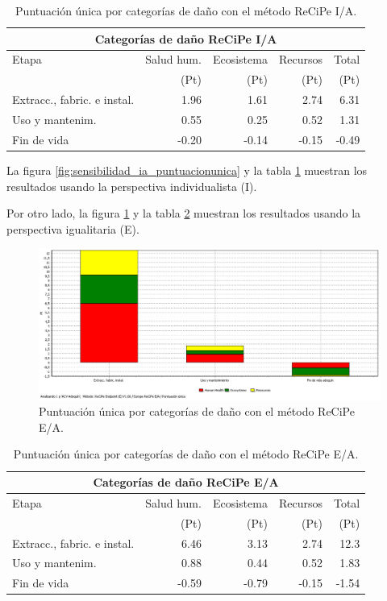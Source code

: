 \begin{table}[!htb]
\centering
\begin{tabular}{p{6cm}rrrr}
\toprule
\multicolumn{5}{c}{Categorías de daño ReCiPe I/A}\\
\midrule
Etapa & Salud hum. & Ecosistema & Recursos & Total\\
 & (Pt) & (Pt) & (Pt) & (Pt)\\
\midrule
Extracc., fabric. e instal. & 1.96 & 1.61 & 2.74 & 6.31\\
Uso y mantenim. & 0.55 & 0.25 & 0.52 & 1.31\\
Fin de vida & -0.20 & -0.14 & -0.15 & -0.49\\
\bottomrule
\end{tabular}
\caption{Puntuación única por categorías de daño con el método ReCiPe I/A.}
\label{sensibilidad_ia_puntuacionunica}
\end{table}

La figura \ref{fig:sensibilidad_ia_puntuacionunica} y la tabla \ref{sensibilidad_ia_puntuacionunica} muestran los resultados usando la perspectiva individualista (I).

Por otro lado, la figura \ref{fig:sensibilidad_ea_puntuacionunica} y la tabla \ref{sensibilidad_ea_puntuacionunica} muestran los resultados usando la perspectiva igualitaria (E).

\begin{figure}[!htb]
\centering
\includegraphics[width=15cm]{img/sensibilidad_ea_puntuacionunica.png}
\caption{Puntuación única por categorías de daño con el método ReCiPe E/A.}
\label{fig:sensibilidad_ea_puntuacionunica}
\end{figure}

\begin{table}[!htb]
\centering
\begin{tabular}{p{6cm}rrrr}
\toprule
\multicolumn{5}{c}{Categorías de daño ReCiPe E/A}\\
\midrule
Etapa & Salud hum. & Ecosistema & Recursos & Total\\
 & (Pt) & (Pt) & (Pt) & (Pt)\\
\midrule
Extracc., fabric. e instal. & 6.46 & 3.13 & 2.74 & 12.3\\
Uso y mantenim. & 0.88 & 0.44 & 0.52 & 1.83\\
Fin de vida & -0.59 & -0.79 & -0.15 & -1.54\\
\bottomrule
\end{tabular}
\caption{Puntuación única por categorías de daño con el método ReCiPe E/A.}
\label{sensibilidad_ea_puntuacionunica}
\end{table}


